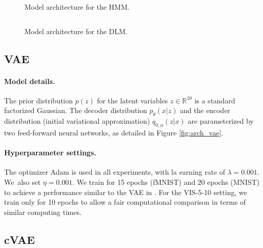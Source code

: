 \begin{figure}[!htp]
\centering
{}
\inputminted[fontsize=\scriptsize]{python}{./hmm.tex}
\caption{Model architecture for the HMM.}
\label{fig:hmm}
\end{figure}

\begin{figure}[!htp]
\centering
{}
\inputminted[fontsize=\scriptsize]{python}{./dlm.tex}
\caption{Model architecture for the DLM.}
\label{fig:dlm}
\end{figure}
\fi

\subsection{VAE}

\paragraph{Model details.}

The prior distribution $p(z)$ for the latent variables $z \in \mathbb{R}^{10}$ is a standard factorized Gaussian. The decoder distribution $p_\theta(x|z)$ and the encoder distribution (initial variational approximation) $q_{0,\phi}(z|x)$ are parameterized by two feed-forward neural networks, as 
detailed in Figure \ref{fig:arch_vae}.



\paragraph{Hyperparameter settings.}
The optimizer Adam is used in all experiments, with 
la earning rate of $\lambda=0.001$. We~also set $\eta = 0.001$. We train for 15 epochs (fMNIST) and 20 epochs (MNIST) to achieve a performance 
similar to the VAE in \parencite{pmlr-v89-titsias19a}. For the VIS-5-10 setting, we train only for 10 epochs to allow a fair computational comparison in terms of similar computing times.

\subsection{cVAE}




